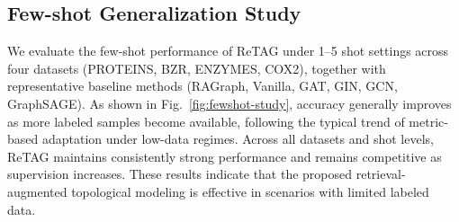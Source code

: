 


\subsection{Few-shot Generalization Study}
We evaluate the few-shot performance of ReTAG under 1–5 shot settings 
across four datasets (PROTEINS, BZR, ENZYMES, COX2), together with 
representative baseline methods (RAGraph, Vanilla, GAT, GIN, GCN, 
GraphSAGE). As shown in Fig.~\ref{fig:fewshot-study}, accuracy 
generally improves as more labeled samples become available, following 
the typical trend of metric-based adaptation under low-data regimes. 
Across all datasets and shot levels, ReTAG maintains consistently strong 
performance and remains competitive as supervision increases. These 
results indicate that the proposed retrieval-augmented topological 
modeling is effective in scenarios with limited labeled data.








